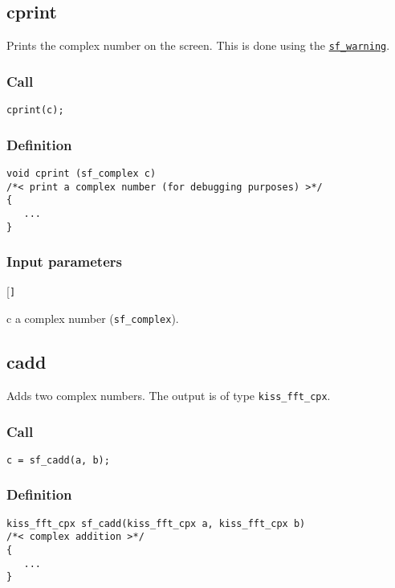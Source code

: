 \subsection{{cprint}}
Prints the complex number on the screen. This is done using the \hyperref[sec:sf_warning]{\texttt{sf\_warning}}.

\subsubsection*{Call}
\begin{verbatim}cprint(c);\end{verbatim}

\subsubsection*{Definition}
\begin{verbatim}
void cprint (sf_complex c)
/*< print a complex number (for debugging purposes) >*/
{
   ...
}
\end{verbatim}

\subsubsection*{Input parameters}
\begin{desclist}{\tt }{\quad}[\tt ]
   \setlength\itemsep{0pt}
   \item[c] a complex number (\texttt{sf\_complex}).  
\end{desclist}




\subsection{{cadd}}
Adds two complex numbers. The output is of type \texttt{kiss\_fft\_cpx}.

\subsubsection*{Call}
\begin{verbatim}c = sf_cadd(a, b);\end{verbatim}

\subsubsection*{Definition}
\begin{verbatim}
kiss_fft_cpx sf_cadd(kiss_fft_cpx a, kiss_fft_cpx b)
/*< complex addition >*/
{
   ...
}
\end{verbatim}

